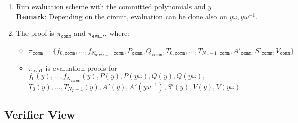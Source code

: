 \begin{enumerate}
    \item Run evaluation scheme with the committed polynomials and $y$ \\
        \textbf{Remark}: Depending on the circuit, evaluation can be done also on $y\omega, y\omega^{-1}$.
    \item The proof is $\pi_{\texttt{comm}}$ and $\pi_{\texttt{eval}}$,, where:
        \begin{itemize}
            \item $\pi_{\texttt{comm}} = \{f_{0, \texttt{comm}}, \dots, f_{N_{\texttt{wires} - 1}, \texttt{comm}},
                    P_{\texttt{comm}}, Q_{\texttt{comm}}, T_{0, \texttt{comm}}, ..., T_{N_T - 1, \texttt{comm}},
                A'_{\texttt{comm}}, S'_{\texttt{comm}}, V_{\texttt{comm}} \}$
            \item  $\pi_{\texttt{eval}}$ is evaluation proofs for $f_0(y), \dots, f_{N_{\texttt{wires}}}(y),
                P(y), P(y\omega), Q(y), Q(y\omega),$ \\
                $T_0(y), \dots, T_{N_T - 1}(y), A'(y), A'(y\omega^{-1}), S'(y), V(y), V(y\omega)$
        \end{itemize}
\end{enumerate}

\subsection{Verifier View}

